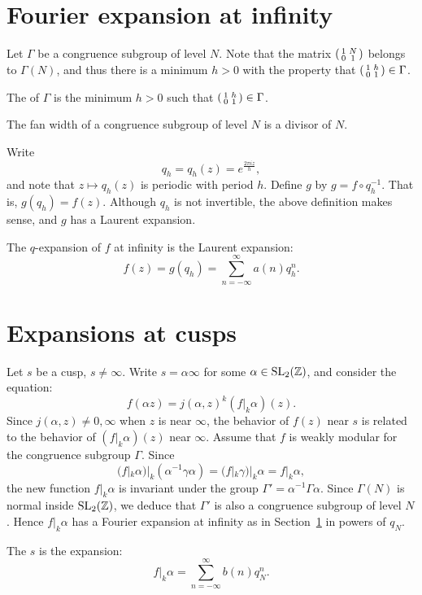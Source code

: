 \section{Fourier expansion at infinity}
\label{sec:fourier-expansion-at-infinity}

Let $\Gamma$ be a congruence subgroup of level $N$. Note that the matrix $\left(\begin{smallmatrix}1&N\\0&1\end{smallmatrix}\right)$ belongs to $\Gamma(N)$, and thus there is a minimum $h>0$ with the property that $\left(\begin{smallmatrix}1&h\\0&1\end{smallmatrix}\right) \in\Gamma$.
\begin{definition}
  The  of $\Gamma$ is the minimum $h>0$ such that $\left(\begin{smallmatrix}1&h\\0&1\end{smallmatrix}\right)\in\Gamma$.
\end{definition}
\begin{remark}
  The fan width of a congruence subgroup of level $N$ is a divisor of $N$.
\end{remark}
Write
\[
q_h =q_h(z)= e^{\frac{2\pi i z}{h}},
\]
and note that $z\mapsto q_h(z)$ is periodic with period $h$. Define $g$ by $g = f\circ q_h^{-1}$.
That is, $g(q_h) = f(z)$. Although $q_h$ is not invertible, the above definition makes sense, and $g$ has
a Laurent expansion.
\begin{definition}
  The $q$-expansion of $f$ at infinity is the Laurent expansion:
\[
f(z) = g(q_h)=\sum_{n=-\infty}^\infty a(n)q_h^n.
\]
\end{definition}

\section{Expansions at cusps}
\label{sec:expansions-at-cusps}


Let $s$ be a cusp, $s\neq \infty$. Write $s =\alpha\infty$ for some $\alpha\in\operatorname{SL}_2(\mathbb{Z})$, and consider the equation:
\[
f(\alpha z) = j(\alpha,z)^{k}(f|_k\alpha)(z).
\]
 Since $j(\alpha,z)\neq 0,\infty$ when $z$ is near $\infty$, the behavior of $f(z)$ near $s$  is related to the behavior of $(f|_k\alpha)(z)$ near $\infty$. Assume that $f$ is weakly modular for the congruence subgroup $\Gamma$. Since\[
(f|_k\alpha)|_k(\alpha^{-1}\gamma\alpha) = (f|_k\gamma)|_k\alpha = f|_k\alpha,
\]
the new function $f|_k\alpha$ is invariant under the group $\Gamma'=\alpha^{-1}\Gamma\alpha$. Since $\Gamma(N)$ is normal inside $\operatorname{SL}_2(\mathbb{Z})$, we deduce that $\Gamma'$ is also a congruence subgroup of level $N$. Hence $f|_k\alpha$ has a Fourier expansion at infinity as in Section~\ref{sec:fourier-expansion-at-infinity} in powers of $q_N$.
\begin{definition}
  The  $s$ is the expansion:
\[
f|_k\alpha = \sum_{n=-\infty}^\infty b(n)q_N^n.
\]
\end{definition}


